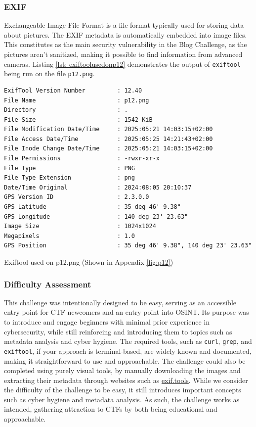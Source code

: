 \subsubsection{EXIF}\label{EXIF}
Exchangeable Image File Format is a file format typically used for storing data about pictures. The EXIF metadata is automatically embedded into image files. This constitutes as the main security vulnerability in the Blog Challenge, as the pictures aren't sanitized, making it possible to find information from advanced cameras.
Listing \ref{lst: exiftoolusedonp12} demonstrates the output of \texttt{exiftool} being run on the file \texttt{p12.png}. 
\begin{listing}[H]
  \begin{verbatim}
ExifTool Version Number         : 12.40
File Name                       : p12.png
Directory                       : .
File Size                       : 1542 KiB
File Modification Date/Time     : 2025:05:21 14:03:15+02:00
File Access Date/Time           : 2025:05:25 14:21:43+02:00
File Inode Change Date/Time     : 2025:05:21 14:03:15+02:00
File Permissions                : -rwxr-xr-x
File Type                       : PNG
File Type Extension             : png
Date/Time Original              : 2024:08:05 20:10:37
GPS Version ID                  : 2.3.0.0
GPS Latitude                    : 35 deg 46' 9.38"
GPS Longitude                   : 140 deg 23' 23.63"
Image Size                      : 1024x1024
Megapixels                      : 1.0
GPS Position                    : 35 deg 46' 9.38", 140 deg 23' 23.63"
  \end{verbatim}
  \vspace{-1.5\baselineskip} %
 \caption{Exiftool used on p12.png (Shown in Appendix \ref{fig:p12})}
\label{lst: exiftoolusedonp12}
\end{listing}

\subsubsection{Difficulty Assessment}
This challenge was intentionally designed to be easy, serving as an accessible entry point for CTF newcomers and an entry point into OSINT. Its purpose was to introduce and engage beginners with minimal prior experience in cybersecurity, while still reinforcing and introducing them to topics such as metadata analysis and cyber hygiene. The required tools, such as \texttt{curl}, \texttt{grep}, and \texttt{exiftool}, if your approach is terminal-based, are widely known and documented, making it straightforward to use and approachable. The challenge could also be completed using purely visual tools, by manually downloading the images and extracting their metadata through websites such as \href{https://exif.tools/}{exif.tools}. While we consider the difficulty of the challenge to be easy, it still introduces important concepts such as cyber hygiene and metadata analysis. As such, the challenge works as intended, gathering attraction to CTFs by both being educational and approachable. 


